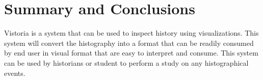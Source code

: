 \section*{Summary and Conclusions}
Vistoria is a system that can be used to inspect history using visualizations. This system will convert the histography into a format that can be readily consumed by end user in visual format that are easy to interpret and consume. This system can be used by historians or student to perform a study on any histographical events.